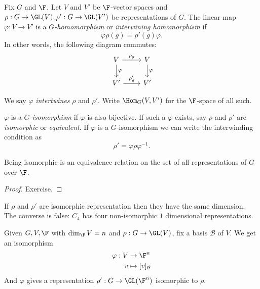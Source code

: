 \documentclass[a4paper]{article}
\begin{document}
\begin{definition}
  Fix \(G\) and \(\F\). Let \(V\) and \(V'\) be \(\F\)-vector spaces and \(\rho: G \to \GL(V), \rho': G \to \GL(V')\) be representations of \(G\). The linear map \(\varphi: V \to V'\) is a \emph{\(G\)-homomorphism} or \emph{interwining homomorphism} if
  \[
    \varphi \rho(g) = \rho'(g) \varphi.
  \]
  In other words, the following diagram commutes:
  \[
    \begin{tikzcd}
      V \ar[r, "\rho_g"] \ar[d, "\varphi"] & V \ar[d, "\varphi"] \\
      V' \ar[r, "\rho_g'"] & V'
    \end{tikzcd}
  \]

  We say \(\varphi\) \emph{intertwines} \(\rho\) and \(\rho'\). Write \(\Hom_G(V, V')\) for the \(\F\)-space of all such.

  \(\varphi\) is a \emph{\(G\)-isomorphism} if \(\varphi\) is also bijective. If such a \(\varphi\) exists, say \(\rho\) and \(\rho'\) are \emph{isomorphic} or \emph{equivalent}. If \(\varphi\) is a \(G\)-isomorphism we can write the interwinding condition as
  \[
    \rho' = \varphi \rho \varphi^{-1}.
  \]
\end{definition}

\begin{lemma}
  Being isomorphic is an equivalence relation on the set of all representations of \(G\) over \(\F\).
\end{lemma}

\begin{proof}
  Exercise.
\end{proof}

\begin{remark}
  If \(\rho\) and \(\rho'\) are isomorphic representation then they have the same dimension. The converse is false:  \(C_4\) has four non-isomorphic \(1\) dimensional representations.
\end{remark}

\begin{remark}
  Given \(G, V, \F\) with \(\dim_\F V = n\) and \(\rho: G \to \GL(V)\), fix a basis \(\mathcal B\) of \(V\). We get an isomorphism
  \begin{align*}
    \varphi: V &\to \F^n \\
    v &\mapsto [v]_{\mathcal B}
  \end{align*}
  And \(\varphi\) gives a representation \(\rho': G \to \GL(\F^n)\) isomorphic to \(\rho\).
\end{remark}
\end{document}
